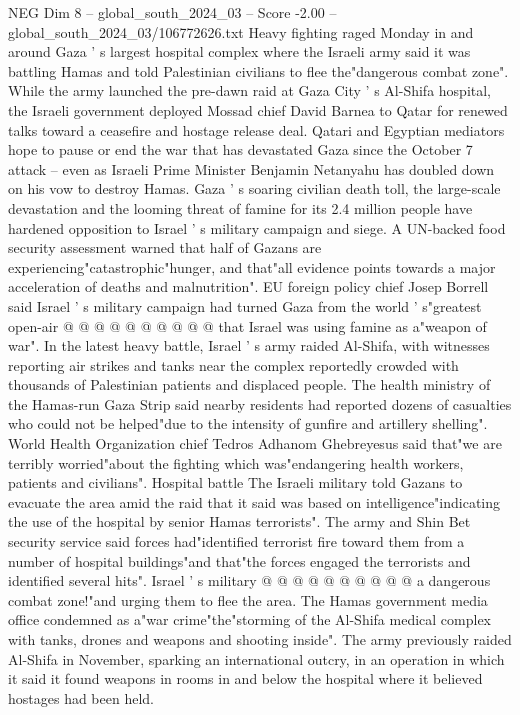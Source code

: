 \begin{textsample}{NEG Dim 8 – global\_south\_2024\_03 – Score -2.00 – global\_south\_2024\_03/106772626.txt}  \label{ex:f8_neg_022}
Heavy fighting raged Monday in and around Gaza ' s largest hospital complex where the Israeli army said it was battling Hamas and told Palestinian civilians to flee the"dangerous combat zone".
While the army launched the pre-dawn raid at Gaza City ' s Al-Shifa hospital, the Israeli government deployed Mossad chief David Barnea to Qatar for renewed talks toward a ceasefire and hostage release deal.
Qatari and Egyptian mediators hope to pause or end the war that has devastated Gaza since the October 7 attack -- even as Israeli Prime Minister Benjamin Netanyahu has doubled down on his vow to destroy Hamas.
Gaza ' s soaring civilian death toll, the large-scale devastation and the looming threat of famine for its 2.4 million people have hardened opposition to Israel ' s military campaign and siege.
A UN-backed food security assessment warned that half of Gazans are experiencing"catastrophic"hunger, and that"all evidence points towards a major acceleration of deaths and malnutrition".
EU foreign policy chief Josep Borrell said Israel ' s military campaign had turned Gaza from the world ' s"greatest open-air @ @ @ @ @ @ @ @ @ @ that Israel was using famine as a"weapon of war".
In the latest heavy battle, Israel ' s army raided Al-Shifa, with witnesses reporting air strikes and tanks near the complex reportedly crowded with thousands of Palestinian patients and displaced people.
The health ministry of the Hamas-run Gaza Strip said nearby residents had reported dozens of casualties who could not be helped"due to the intensity of gunfire and artillery shelling".
World Health Organization chief Tedros Adhanom Ghebreyesus said that"we are terribly worried"about the fighting which was"endangering health workers, patients and civilians".
Hospital battle The Israeli military told Gazans to evacuate the area amid the raid that it said was based on intelligence"indicating the use of the hospital by senior Hamas terrorists".
The army and Shin Bet security service said forces had"identified terrorist fire toward them from a number of hospital buildings"and that"the forces engaged the terrorists and identified several hits".
Israel ' s military @ @ @ @ @ @ @ @ @ @ a dangerous combat zone!"and urging them to flee the area.
The Hamas government media office condemned as a"war crime"the"storming of the Al-Shifa medical complex with tanks, drones and weapons and shooting inside".
The army previously raided Al-Shifa in November, sparking an international outcry, in an operation in which it said it found weapons in rooms in and below the hospital where it believed hostages had been held.

\end{textsample}
